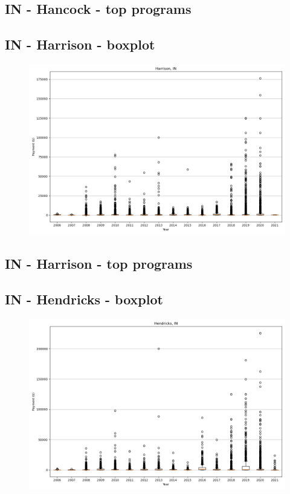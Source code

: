 \subsection*{IN - Hancock - top programs}

\newpage
\subsection*{IN - Harrison - boxplot}
\begin{figure}[h]
\centering
\includegraphics[width=7in]{../output/boxplots/counties/Harrison-IN_boxplot.png}
\end{figure}


\subsection*{IN - Harrison - top programs}

\newpage
\subsection*{IN - Hendricks - boxplot}
\begin{figure}[h]
\centering
\includegraphics[width=7in]{../output/boxplots/counties/Hendricks-IN_boxplot.png}
\end{figure}


